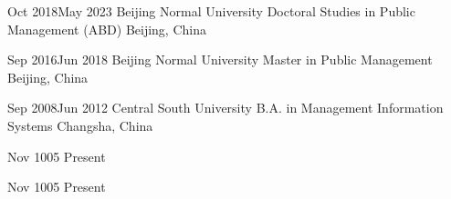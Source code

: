 {
{Oct 2018}{May 2023}
{Beijing Normal University}
{Doctoral Studies in Public Management (ABD)}
{Beijing, China}

{Sep 2016}{Jun 2018}
{Beijing Normal University}
{Master in Public Management}
{Beijing, China}

{Sep 2008}{Jun 2012}
{Central South University}
{B.A. in Management Information Systems}
{Changsha, China}





\def\certificates{
\jbegin
  \item \small \href{https://www.coursera.org/account/accomplishments/records/XJ6XC6RBRC7M}{Data Analysis – IBM}
  \item \small \href{https://www.coursera.org/account/accomplishments/records/R9K4ON9NF5CF}{Data Visualization – IBM}
  \item \small \href{https://www.coursera.org/account/accomplishments/records/XG1WNFXIWIBP}{Databases and SQL \textbf{(With Honors)} – IBM}
  \item \small \href{https://www.coursera.org/account/accomplishments/records/5POTXJ6UNO90}{Data Science Methodology – IBM}
  \item \small \href{https://www.coursera.org/account/accomplishments/records/5POTXJ6UNO90}{Machine Learning – IBM}
  \item \small \href{https://www.coursera.org/account/accomplishments/records/TX4MPGN4ED9M}{Data Science, AI \& Development – IBM}
  \item \small \href{https://www.coursera.org/account/accomplishments/records/2VSWAG97WFDA}{Generative AI – IBM}
\jend
}


{Nov 1005}
{Present}
{\lrand[1]}
{\lrand[1]}
{\lrand[1]}
{
\jbegin
    \jitem{\lrand[2]}
    \jitem{\lrand[1]}
    \jitem{\lrand[7]}
\jend
}

{Nov 1005}
{Present}
{\lrand[1]}
{\lrand[1]}
{\lrand[1]}
{
\jbegin
    \jitem{\lrand[2]}
    \jitem{\lrand[1]}
    \jitem{\lrand[7]}
\jend
}


}

